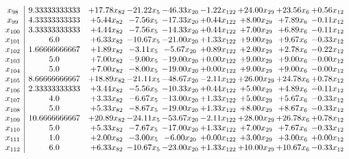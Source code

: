 \documentclass[8pt]{article}
\begin{document}
\[\begin{array}{c| c c@{\hskip 2pt} c@{\hskip 2pt} c@{\hskip 2pt} c@{\hskip 2pt} c@{\hskip 2pt} c@{\hskip 2pt} c@{\hskip 2pt} }
 x_{98}   &  9.33333333333 & + 17.78 x_{82} & -21.22 x_{5} & -46.33 x_{20} & -1.22 x_{122} & + 24.00 x_{29} & + 23.56 x_{6} & +  0.56 x_{12}\\
 x_{99}   &  4.33333333333 & +  5.44 x_{82} & -7.56 x_{5} & -17.33 x_{20} & +  0.44 x_{122} & +  8.00 x_{29} & +  7.89 x_{6} & -0.11 x_{12}\\
 x_{100}   &  3.33333333333 & +  4.44 x_{82} & -7.56 x_{5} & -14.33 x_{20} & +  0.44 x_{122} & +  7.00 x_{29} & +  6.89 x_{6} & -0.11 x_{12}\\
 x_{101}   &  6.0 & +  6.33 x_{82} & -10.67 x_{5} & -21.00 x_{20} & +  1.33 x_{122} & +  9.00 x_{29} & +  9.67 x_{6} & -0.33 x_{12}\\
 x_{102}   &  1.66666666667 & +  1.89 x_{82} & -3.11 x_{5} & -5.67 x_{20} & +  0.89 x_{122} & +  2.00 x_{29} & +  2.78 x_{6} & -0.22 x_{12}\\
 x_{103}   &  5.0 & +  7.00 x_{82} & -9.00 x_{5} & -19.00 x_{20} & +  0.00 x_{122} & +  9.00 x_{29} & +  9.00 x_{6} & -0.00 x_{12}\\
 x_{104}   &  5.0 & +  7.00 x_{82} & -8.00 x_{5} & -19.00 x_{20} & +  0.00 x_{122} & +  9.00 x_{29} & +  9.00 x_{6} & -0.00 x_{12}\\
 x_{105}   &  8.66666666667 & + 18.89 x_{82} & -21.11 x_{5} & -48.67 x_{20} & -2.11 x_{122} & + 26.00 x_{29} & + 24.78 x_{6} & +  0.78 x_{12}\\
 x_{106}   &  2.33333333333 & +  3.44 x_{82} & -5.56 x_{5} & -10.33 x_{20} & +  0.44 x_{122} & +  5.00 x_{29} & +  4.89 x_{6} & -0.11 x_{12}\\
 x_{107}   &  4.0 & +  3.33 x_{82} & -6.67 x_{5} & -13.00 x_{20} & +  1.33 x_{122} & +  5.00 x_{29} & +  5.67 x_{6} & -0.33 x_{12}\\
 x_{108}   &  5.0 & +  5.33 x_{82} & -8.67 x_{5} & -19.00 x_{20} & +  1.33 x_{122} & +  8.00 x_{29} & +  8.67 x_{6} & -0.33 x_{12}\\
 x_{109}   &  10.6666666667 & + 20.89 x_{82} & -24.11 x_{5} & -53.67 x_{20} & -2.11 x_{122} & + 28.00 x_{29} & + 26.78 x_{6} & +  0.78 x_{12}\\
 x_{110}   &  5.0 & +  5.33 x_{82} & -7.67 x_{5} & -17.00 x_{20} & +  1.33 x_{122} & +  7.00 x_{29} & +  7.67 x_{6} & -0.33 x_{12}\\
 x_{111}   &  1.0 & +  2.00 x_{82} & -3.00 x_{5} & -6.00 x_{20} & +  0.00 x_{122} & +  3.00 x_{29} & +  3.00 x_{6} & +  0.00 x_{12}\\
 x_{112}   &  6.0 & +  6.33 x_{82} & -10.67 x_{5} & -23.00 x_{20} & +  1.33 x_{122} & + 10.00 x_{29} & + 10.67 x_{6} & -0.33 x_{12}\\

\end{array}\]
\end{document}

